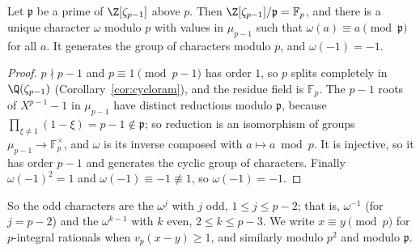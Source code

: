 \begin{lemma}\label{lem:teich}
Let $\mathfrak p$ be a prime of $\Z[\zeta_{p-1}]$ above $p$. Then $\Z[\zeta_{p-1}]/\mathfrak p=\mathbb F_p$, and there is a unique character
$\omega$ modulo $p$ with values in $\mu_{p-1}$ such that $\omega(a)\equiv a\pmod{\mathfrak p}$ for all $a$. It generates the group of characters
modulo $p$, and $\omega(-1)=-1$.
\end{lemma}
\begin{proof}
$p\nmid p-1$ and $p\equiv1\pmod{p-1}$ has order $1$, so $p$ splits completely in $\Q(\zeta_{p-1})$ (Corollary~\ref{cor:cycloram}), and the
residue field is $\mathbb F_p$. The $p-1$ roots of $X^{p-1}-1$ in $\mu_{p-1}$ have distinct reductions modulo $\mathfrak p$, because
$\prod_{\xi\ne1}(1-\xi)=p-1\notin\mathfrak p$; so reduction is an isomorphism of groups $\mu_{p-1}\to\mathbb F_p^\times$, and $\omega$ is its
inverse composed with $a\mapsto a\bmod p$. It is injective, so it has order $p-1$ and generates the cyclic group of characters. Finally
$\omega(-1)^2=1$ and $\omega(-1)\equiv-1\not\equiv1$, so $\omega(-1)=-1$.
\end{proof}

So the odd characters are the $\omega^{j}$ with $j$ odd, $1\le j\le p-2$; that is, $\omega^{-1}$ (for $j=p-2$) and the $\omega^{k-1}$ with $k$
even, $2\le k\le p-3$. We write $x\equiv y\pmod p$ for $p$-integral rationals when $v_p(x-y)\ge1$, and similarly modulo $p^2$ and modulo
$\mathfrak p$.

